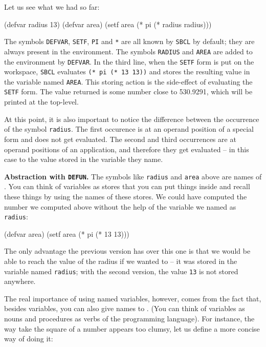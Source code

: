 \documentclass[a4paper,11pt]{article}
\begin{document}
\begin{uenum}
\item Let us see what we had so far: 

\begin{lispcode}
(defvar radius 13)
(defvar area)
(setf area (* pi (* radius radius)))
\end{lispcode}

The symbols \Verb+DEFVAR+, \Verb+SETF+, \Verb+PI+ and \Verb+*+ are all known by \Verb+SBCL+ by default; they are always present in the environment. The symbols \Verb+RADIUS+ and \Verb+AREA+ are added to the environment by \Verb+DEFVAR+. In the third line, when the \Verb+SETF+ form is put on the workspace, \Verb+SBCL+ evaluates \Verb+(* pi (* 13 13))+ and stores the resulting value in the variable named \Verb+AREA+. This storing action is the side-effect of evaluating the \Verb+SETF+ form. The value returned is some number close to 530.9291, which will be printed at the top-level.

At this point, it is also important to notice the difference between the occurrence of the symbol \Verb+radius+. The first occurence is at an operand position of a special form and does not get evaluated. The second and third occurrences are at operand positions of an application, and therefore they get evaluated -- in this case to the value stored in the variable they name.

\item {\bf Abstraction with \Verb+DEFUN+.} The symbols like \Verb+radius+ and \Verb+area+ above are names of . You can think of variables as stores that you can put things inside and recall these things by using the names of these stores. We could have computed the number we computed above without the help of the variable we named as \Verb+radius+:

\begin{lispcode}
(defvar area)
(setf area (* pi (* 13 13)))
\end{lispcode}

The only advantage the previous version has over this one is that we would be able to reach the value of the radius if we wanted to -- it was stored in the variable named \Verb+radius+; with the second version, the value \Verb+13+ is not stored anywhere. 

The real importance of using named variables, however, comes from the fact that, besides variables, you can also give names to . (You can think of variables as nouns and procedures as verbs of the programming language). For instance, the way take the square of a number appears too clumsy, let us define a more concise way of doing it: 


\end{uenum}
\end{document}
